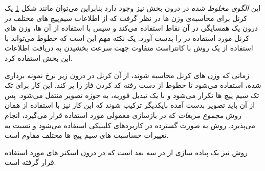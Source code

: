  

\begin{figure}[t!]
	\centering
	\removevspace[1]
	\caption{}
	\label{fig:grappa-scheme}
\end{figure}

این \textit{الگوی مخلوط شده}
در درون بخش 
نیز وجود دارد بنابراین می‌توان مانند شکل \ref{fig:grappa-scheme}
یک کرنل برای محاسبه‌ی وزن ها در نظر گرفت که از اطلاعات سیم‌پیچ های مختلف در درون یک همسایگی در آن نقاط استفاده می‌کند و  سپس با استفاده از آن 
ها، وزن های کرنل مورد استفاده در 
را بدست آورد. یک نکته مهم این است که خطوط 
می‌تواند با استفاده از یک روش با کانتراست متفاوت جهت سرعت بخشیدن به دریافت اطلاعات این بخش استفاده کرد.


زمانی که وزن های کرنل محاسبه شوند، از آن کرنل در درون \kspace زیر نرخ نمونه برداری شده، استفاده می‌شود تا خطوط از دست رفته کد کردن فاز را پر کند. این کار برای تک تک سیم پیچ ها تکرار می‌شود و با یک تبدیل فوریه،‌ به حوزه تصویر منتقل می‌شود. پس از آن باید تصویر بدست آمده بایکدیگر ترکیب شوند که این کار نیز با استفاده از همان روش \textit{مجموع مربعات}
که در بازسازی معمولی مورد استفاده قرار می‌گیرد، انجام می‌پذیرد.
\cite{ParallelMRImaging2012}
روش 
به صورت گسترده در کاربردهای کلینیکی استفاده می‌شود و نسبت به تغییرات حساسیت های سیم پیچ ها مختلف مقاوم است.

روش 
نیز یک پیاده سازی از 
در سه بعد است که در درون اسکنر های 
مورد استفاده قرار گرفته است.




